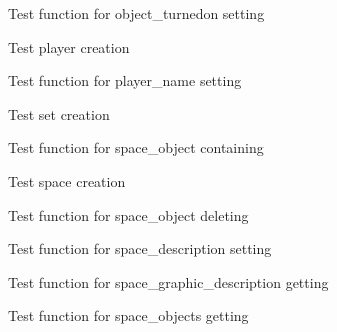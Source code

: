 \begin{DoxyRefList}
%
Test function for object\+\_\+turnedon setting  
\item[Member \mbox{\hyperlink{player__test_8h_a4f6eca5f9d8c08d2a7fc70c209ecf854}{test2\+\_\+player\+\_\+create}} ()]\label{test__test000099}%
%
Test player creation  
\item[Member \mbox{\hyperlink{player__test_8h_a6e7ce8ff791f4bf63749df647a44263f}{test2\+\_\+player\+\_\+set\+\_\+name}} ()]\label{test__test000101}%
%
Test function for player\+\_\+name setting  
\item[Member \mbox{\hyperlink{set__test_8h_abed3d273788e23fc31ae7f5ed59277b9}{test2\+\_\+set\+\_\+create}} ()]\label{test__test000103}%
%
Test set creation  
\item[Member \mbox{\hyperlink{space__test_8h_a9d1b9f554450b44aaf5e6ede5ac53234}{test2\+\_\+space\+\_\+contain\+\_\+object}} ()]\label{test__test000115}%
%
Test function for space\+\_\+object containing  
\item[Member \mbox{\hyperlink{space__test_8h_a012cd3cf37a8d91e2d7098a264c29d65}{test2\+\_\+space\+\_\+create}} ()]\label{test__test000106}%
%
Test space creation  
\item[Member \mbox{\hyperlink{space__test_8h_a5727fc65ee0f976061f63d2bfd7e95fe}{test2\+\_\+space\+\_\+del\+\_\+object}} ()]\label{test__test000117}%
%
Test function for space\+\_\+object deleting  
\item[Member \mbox{\hyperlink{space__test_8h_aebfa57e927e8f871e73425975c11976b}{test2\+\_\+space\+\_\+get\+\_\+description}} ()]\label{test__test000123}%
%
Test function for space\+\_\+description setting  
\item[Member \mbox{\hyperlink{space__test_8h_a3422f19fd8a821a06ccba2feb52034c2}{test2\+\_\+space\+\_\+get\+\_\+gdesc}} ()]\label{test__test000113}%
%
Test function for space\+\_\+graphic\+\_\+description getting  
\item[Member \mbox{\hyperlink{space__test_8h_ae9aec87526c060b4fd22ca1928c1cb22}{test2\+\_\+space\+\_\+get\+\_\+objects}} ()]\label{test__test000119}%
%
Test function for space\+\_\+objects getting  
\item[Member \mbox{\hyperlink{space__test_8h_ab3dd07cbead60f87866e2bd2c426da0f}{test2\+\_\+space\+\_\+set\+\_\+description}} ()]\label{test__test000121}%

\end{DoxyRefList}
